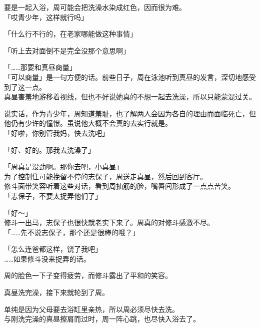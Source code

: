 要是一起入浴，周可能会把洗澡水染成红色，因而很为难。\\

「哎青少年，这样就行吗」

「什么行不行的，在老家哪能做这种事情」

「听上去对面倒不是完全没那个意思啊」

「……那要和真昼商量」\\

「可以商量」是一句方便的话。前些日子，周在泳池听到真昼的发言，深切地感受到了这一点。\\

真昼害羞地游移着视线，但也不好说她真的不想一起去洗澡，所以只能蒙混过关。

说实话，作为青少年，周知道羞耻，也了解两人会因为各自的理由而面临死亡，但他仍有少许的憧憬。虽说他大概不会真的去实行就是。\\

「好啦，你别管我妈，快去洗吧」

「好、好的。那我去洗澡了」

「周真是没劲啊。那你去吧，小真昼」\\

为了控制住可能挽留不停的志保子，周送走真昼，然后回到客厅。\\

修斗面带笑容听着这些对话，看到周抽筋的脸，嘴唇间形成了一点点苦笑。\\

「志保子，不要太捉弄他们了」

「好～」\\

修斗一出马，志保子也很快就老实下来了。周真的对修斗感激不尽。\\

「……先不说志保子，那个还是很棒的哦？」

「怎么连爸都这样，饶了我吧」\\

……如果修斗没来捉弄的话。

周的脸色一下子变得疲劳，而修斗露出了平和的笑容。\\

\vspace{2\baselineskip}

真昼洗完澡，接下来就轮到了周。

单纯是因为父母要去浴缸里亲热，所以周必须尽快去洗。\\

与刚洗完澡的真昼擦肩而过时，周一阵心跳，也尽快入浴去了。

